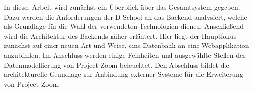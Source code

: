 In dieser Arbeit wird zunächst ein Überblick über das Gesamtsystem gegeben. Dazu werden die Anforderungen der D-School an das Backend analysiert, welche als Grundlage für die Wahl der verwendeten Technologien dienen. Anschließend wird die Architektur des Backends näher erläutert. Hier liegt der Hauptfokus zunächst auf einer neuen Art und Weise, eine Datenbank an eine Webapplikation anzubinden. Im Anschluss werden einige Feinheiten und ausgewählte Stellen der Datenmodellierung von Project-Zoom beleuchtet. Den Abschluss bildet die architekturelle Grundlage zur Anbindung externer Systeme für die Erweiterung von Project-Zoom.

